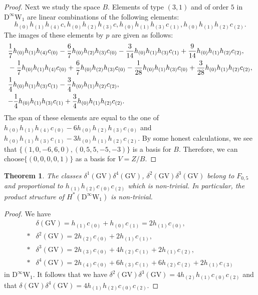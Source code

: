 \documentclass[12pt]{amsart}
\newcommand{\GV}{\mathrm{GV}}
\newcommand{\W}{\mathrm{W}}
\newcommand{\D}{\mathrm{D}}
\newtheorem{theorem}{Theorem}[section]
\theoremstyle{definition}
\theoremstyle{remark}
\begin{document}
\begin{proof}
Next we study the space $B$.
Elements of type $(3,1)$ and of order $5$ in $\D^\infty\W_1$ are linear combinations of the following elements:
%
\[
h_{(0)}h_{(1)}h_{(4)}c,h_{(0)}h_{(2)}h_{(3)}c,%
h_{(0)}h_{(1)}h_{(3)}c_{(1)},%
h_{(0)}h_{(1)}h_{(2)}c_{(2)}.
\]
The images of these elements by $p$ are given as follows:
\begin{align*}
&\frac17h_{(0)}h_{(1)}h_{(4)}c_{(0)}-\frac67h_{(0)}h_{(2)}h_{(3)}c_{(0)}-\frac3{14}h_{(0)}h_{(1)}h_{(3)}c_{(1)}+\frac9{14}h_{(0)}h_{(1)}h_{(2)}c_{(2)},\\*
&-\frac17h_{(0)}h_{(1)}h_{(4)}c_{(0)}+\frac67h_{(0)}h_{(2)}h_{(3)}c_{(0)}-\frac1{28}h_{(0)}h_{(1)}h_{(3)}c_{(0)}+\frac3{28}h_{(0)}h_{(1)}h_{(2)}c_{(2)},\\*
&\frac14h_{(0)}h_{(1)}h_{(3)}c_{(1)}-\frac34h_{(0)}h_{(1)}h_{(2)}c_{(2)},\\*
&\mathnormal{-}\frac14h_{(0)}h_{(1)}h_{(3)}c_{(1)}+\frac34h_{(0)}h_{(1)}h_{(2)}c_{(2)}.
\end{align*}
The span of these elements are equal to the one of $h_{(0)}h_{(1)}h_{(4)}c_{(0)}-6h_{(0)}h_{(2)}h_{(3)}c_{(0)}$ and $h_{(0)}h_{(1)}h_{(3)}c_{(1)}-3h_{(0)}h_{(1)}h_{(2)}c_{(2)}$.
By some honest calculations, we see that $\{(1,0,-6,6,0),(0,5,5,-5,-3)\}$ is a basis for $B$.
Therefore, we can choose\linebreak $\{(0,0,0,0,1)\}$ as a basis for $V=Z/B$.
\end{proof}

\begin{theorem}
\label{thm10.8}
The classes $\delta^1(\GV)\delta^4(\GV)$, $\delta^2(\GV)\delta^3(\GV)$ belong to $F_{0,5}$ and proportional to $h_{(1)}h_{(2)}c_{(0)}c_{(2)}$ which is non-trivial.
In particular, the product structure of $H^*(\D^\infty\W_1)$ is non-trivial.
\end{theorem}
\begin{proof}
We have
\begin{align*}
&\delta(\GV)=h_{(1)}c_{(0)}+h_{(0)}c_{(1)}=2h_{(1)}c_{(0)},\\*
&\delta^2(\GV)=2h_{(2)}c_{(0)}+2h_{(1)}c_{(1)},\\*
&\delta^3(\GV)=2h_{(3)}c_{(0)}+4h_{(2)}c_{(1)}+2h_{(1)}c_{(2)},\\*
&\delta^4(\GV)=2h_{(4)}c_{(0)}+6h_{(3)}c_{(1)}+6h_{(2)}c_{(2)}+2h_{(1)}c_{(3)}
\end{align*}
in $\D^\infty\W_1$.
It follows that we have $\delta^2(\GV)\delta^3(\GV)=4h_{(2)}h_{(1)}c_{(0)}c_{(2)}$ and that $\delta(\GV)\delta^4(\GV)=4h_{(1)}h_{(2)}c_{(0)}c_{(2)}$.
\end{proof}
\end{document}

